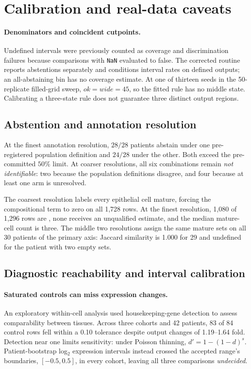 \section{Calibration and real-data caveats}
\label{app:gridcaveats}

\paragraph{Denominators and coincident cutpoints.}
Undefined intervals were previously counted as coverage and discrimination
failures because comparisons with \texttt{NaN} evaluated to false.
The corrected routine reports abstentions separately and conditions interval
rates on defined outputs; an all-abstaining bin has no coverage estimate.
At one of thirteen seeds in the 50-replicate filled-grid sweep, $ok=wide=45$,
so the fitted rule has no middle state. Calibrating a three-state rule does
not guarantee three distinct output regions.

\subsection{Abstention and annotation resolution}
\label{app:modal}
At the finest annotation resolution, $28/28$ patients abstain under one
pre-registered population definition and $24/28$ under the other. Both exceed
the pre-committed $50\%$ limit. At coarser resolutions, all six combinations
remain \emph{not identifiable}: two because the population definitions disagree,
and four because at least one arm is unresolved.

The coarsest resolution labels every epithelial cell mature, forcing the
compositional term to zero on all 1{,}728 rows. At the finest resolution,
1{,}080 of 1{,}296 rows are \notest{}, none receives an unqualified estimate,
and the median mature-cell count is three. The middle two resolutions assign
the same mature sets on all 30 patients of the primary axis: Jaccard similarity
is 1.000 for 29 and undefined for the patient with two empty sets.

\subsection{Diagnostic reachability and interval calibration}
\label{app:guards}

\paragraph{Saturated controls can miss expression changes.}
An exploratory within-cell analysis used housekeeping-gene detection to assess
comparability between tissues. Across three cohorts and 42 patients, 83 of 84
control rows fell within a 0.10 tolerance despite output changes of 1.19--1.64
fold. Detection near one limits sensitivity: under Poisson thinning,
$d'=1-(1-d)^s$. Patient-bootstrap log$_2$ expression intervals instead crossed
the accepted range's boundaries, $[-0.5,0.5]$, in every cohort, leaving all
three comparisons \emph{undecided}.

